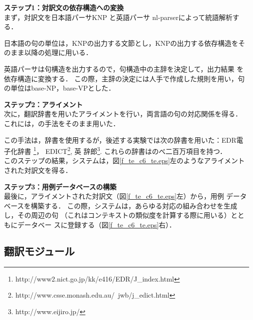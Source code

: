 \begin{description}
  \item \textbf{ステップ1：対訳文の依存構造への変換}\\
  まず，対訳文を日本語パーサKNP \cite{Kurohashi1994}と英語パーサ
  nl-parser\cite{Charniak2000}によって統語解析する．

  日本語の句の単位は，KNPの出力する文節とし，KNPの出力する依存構造をそ
  のまま以降の処理に用いる．

  英語パーサは句構造を出力するので，句構造中の主辞を決定して，出力結果
  を依存構造に変換する．
  この際，主辞の決定には人手で作成した規則を用い，句の単位はbase-NP，base-VPとした．
  \\
  \item \textbf{ステップ2：アライメント}\\
  次に，翻訳辞書を用いたアライメントを行い，両言語の句の対応関係を得る．
  これには，\cite{Aramaki2001}の手法をそのまま用いた．
  
  
  
  
  
  
  
  この手法は，辞書を使用するが，後述する実験では次の辞書を用いた：EDR電子化辞書
  \footnote{http://www2.nict.go.jp/kk/e416/EDR/J\_index.html}，
  EDICT\footnote{http://www.csse.monash.edu.au/~jwb/j\_edict.html}, 英
  辞郎\footnote{http://www.eijiro.jp/}.
  これらの辞書はのべ二百万項目を持つ．
  \\
  このステップの結果，システムは，図\ref{f_te_c6_te.eps}左のようなアライメントされた対訳文を得る．
  \\
  \item \textbf{ステップ3：用例データベースの構築}\\
  最後に，アライメントされた対訳文（図\ref{f_te_c6_te.eps}左）から，用例
  データベースを構築する．
  この際，システムは，あらゆる対応の組み合わせを生成し，その周辺の句
  （これはコンテキストの類似度を計算する際に用いる）とともにデータベー
  スに登録する（図\ref{f_te_c6_te.eps}右）．
\end{description}

\subsection{翻訳モジュール}

